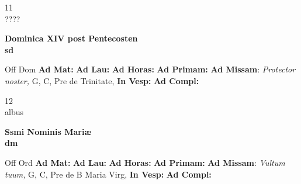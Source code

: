 \documentclass[10pt, openany]{book}
\begin{document}
    \begin{center}
        \begin{minipage}{3.5in}
            \vspace{2em}
            \begin{minipage}{0.5in}
                {\Huge 11} \\
                {\normalsize ????}
            \end{minipage}
            \begin{minipage}{3.0in}
                \textbf{ \large Dominica XIV post Pentecosten \\
                \textnormal{\normalsize sd}}

            \end{minipage}
            \begin{justify}Off Dom
                \textbf{Ad Mat: }
                \textbf{Ad Lau: }
                \textbf{Ad Horas: }
                \textbf{Ad Primam: }\textbf{Ad Missam}: \textit{Protector noster,} G, C, Pre de Trinitate, 
                \textbf{In Vesp: }
                \textbf{Ad Compl: }
            \end{justify}
        \end{minipage}
    \end{center}

    \begin{center}
        \begin{minipage}{3.5in}
            \vspace{2em}
            \begin{minipage}{0.5in}
                {\Huge 12} \\
                {\normalsize albus}
            \end{minipage}
            \begin{minipage}{3.0in}
                \textbf{ \large Ssmi Nominis Mariæ \\
                \textnormal{\normalsize dm}}

            \end{minipage}
            \begin{justify}Off Ord
                \textbf{Ad Mat: }
                \textbf{Ad Lau: }
                \textbf{Ad Horas: }
                \textbf{Ad Primam: }\textbf{Ad Missam}: \textit{Vultum tuum,} G, C, Pre de B Maria Virg, 
                \textbf{In Vesp: }
                \textbf{Ad Compl: }
            \end{justify}
        \end{minipage}
    \end{center}
\end{document}
